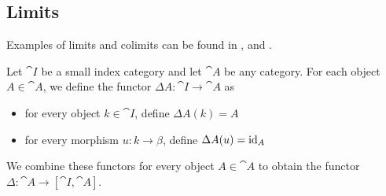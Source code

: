 \subsection{Limits}\label{subsec:categorical_limits}

\begin{remark}\label{def:categorical_limit_examples}
  Examples of limits and colimits can be found in ,  and .
\end{remark}

\begin{definition}\label{def:diagonal_functor}\mcite\cite[143]{Leinster2016Basic}
  Let \( \cat{I} \) be a small index category and let \( \cat{A} \) be any category. For each object \( A \in \cat{A} \), we define the functor \( \Delta A: \cat{I} \to \cat{A} \) as
  \begin{itemize}
    \item for every object \( k \in \cat{I} \), define \( \Delta A(k) = A \)
    \item for every morphism \( u: k \to \beta \), define \( \Delta A(u) = \operatorname{id}_A \)
  \end{itemize}

  We combine these functors for every object \( A \in \cat{A} \) to obtain the functor \( \Delta: \cat{A} \to [\cat{I}, \cat{A}] \).
\end{definition}

